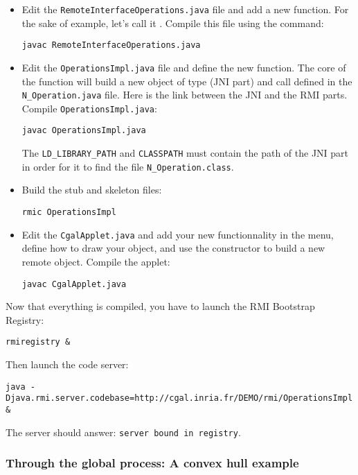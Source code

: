 \begin{itemize}
\item Edit the \texttt{RemoteInterfaceOperations.java} file
     and add a new function. For the sake of example, let's call it  
     . Compile this file using the command:  \\
     \centerline{\texttt{javac RemoteInterfaceOperations.java}}
\item Edit the \texttt{OperationsImpl.java} file
      and define the new  function. The core of the 
       function will build a new object of type 
       (JNI part) and call 
      defined in the \texttt{N\_Operation.java} file. Here is the link
      between the JNI and the RMI parts. Compile \texttt{OperationsImpl.java}:
\\
      \centerline{\texttt{javac OperationsImpl.java}}
     The \texttt{LD\_LIBRARY\_PATH} and \texttt{CLASSPATH} must contain the 
     path of the JNI part in order for it to find the file 
     \texttt{N\_Operation.class}.
\item Build the stub and skeleton files: \\
      \centerline{\texttt{rmic OperationsImpl}}
\item Edit the \texttt{CgalApplet.java} and add your new
      functionnality in the menu, define how to draw your object, and use the
      constructor to build a new remote object. Compile the applet: \\
     \centerline{\texttt{javac CgalApplet.java}}
\end{itemize}

Now that everything is compiled, you have to launch the RMI Bootstrap
Registry: 
\\
\centerline{\texttt{rmiregistry \&}}

Then launch the code server:

\centerline{\texttt{java -Djava.rmi.server.codebase=http://cgal.inria.fr/DEMO/rmi/OperationsImpl \&}}

The server should answer: \texttt{server bound in registry}.

\subsubsection{Through the global process: A convex hull example}
\label{sec:java_demo_example}
 

